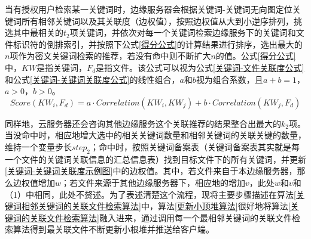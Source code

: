 \documentclass[promaster]{thesis-uestc}
\begin{document}
当有授权用户检索某一关键词时，边缘服务器会根据关键词-关键词无向图定位关键词所有相邻关键词以及其关联度（边权值），按照边权值从大到小逆序排列，挑选其中最相关的$t_2$项关键词，并依次对每一个关键词检索边缘服务下的关键词和文件标识符的倒排索引，并按照下公式\ref{得分公式}的计算结果进行排序，选出最大的$n$项作为密文关键词检索的推荐，若没有命中则不断扩大$n$的值。公式\ref{得分公式}中，$KW$是指关键词，$F_d$是指文件。该公式可以视为公式\ref{关键词-文件关联度公式}和公式\ref{关键词-关键词关联度公式}的线性组合，$a$和$b$视为组合系数，且$a + b = 1$，$a>0$，$b>0$。
\begin{equation}
    Score(KW_i, F_d) = a \cdot Correlation(KW_i, KW_j) + b \cdot Correlation(KW_j, F_d)
    \label{得分公式}
\end{equation}

同样地，云服务器还会咨询其他边缘服务这个关联推荐的结果整合出最大的$k_2$项。当没命中时，相应地增大选中的相关关键词数量和相邻关键词的关联关键的数量，维持一个变量步长$step_2$；命中时，按照关键词备案表（关键词备案表其实就是每一个文件的关键词关联信息的汇总信息表）找到目标文件下的所有关键词，并更新\ref{关键词-关键词关联度示例图}中的边权值。其中，若文件来自于本边缘服务器，那么边权值增加$w$；若文件来源于其他边缘服务器下，相应地的增加$v$，此处$w$和$v$和（1）中相同，此处不赘述。为了表述清楚这个流程，现将主要步骤描述在算法\ref{关键词相邻关键词的关联文件检索算法}中，算法\ref{更新小顶堆算法}很好地将算法\ref{关键词的关联文件检索算法}融入进来，通过调用每一个最相邻关键词的关联文件检索算法得到最关联文件不断更新小根堆并推送给客户端。
\end{document}
